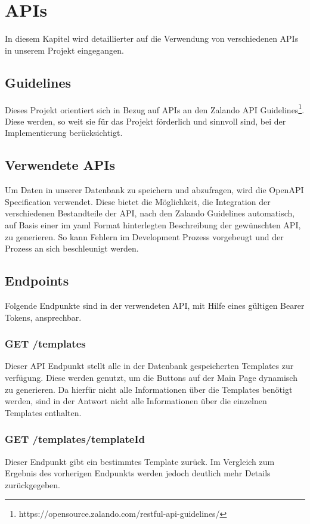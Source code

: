 \chapter{\ac{API}s}\label{ch:apis}
In diesem Kapitel wird detaillierter auf die Verwendung von verschiedenen \ac{API}s in unserem 
Projekt eingegangen.

\section{Guidelines}
Dieses Projekt orientiert sich in Bezug auf \ac{API}s an den Zalando API
Guidelines\footnote{https://opensource.zalando.com/restful-api-guidelines/}.
Diese werden, so weit sie für das Projekt förderlich und sinnvoll sind, bei der Implementierung
berücksichtigt.

\section{Verwendete \ac{API}s}
Um Daten in unserer Datenbank zu speichern und abzufragen, wird die OpenAPI Specification
verwendet. Diese bietet die Möglichkeit, die Integration der verschiedenen Bestandteile der
\ac{API}, nach den Zalando Guidelines automatisch, auf Basis einer im \Gls{yaml} Format hinterlegten
Beschreibung der gewünschten \ac{API}, zu generieren. So kann Fehlern im Development
Prozess vorgebeugt und der Prozess an sich beschleunigt werden.

\section{Endpoints}
Folgende Endpunkte sind in der verwendeten \ac{API}, mit Hilfe eines gültigen Bearer Tokens, ansprechbar. 

\subsection{GET /templates}

Dieser \ac{API} Endpunkt stellt alle in der Datenbank gespeicherten Templates zur verfügung.
Diese werden genutzt, um die Buttons auf der Main Page dynamisch zu generieren.
Da hierfür nicht alle Informationen über die Templates benötigt werden, sind in der Antwort nicht alle
Informationen über die einzelnen Templates enthalten.

\subsection{GET /templates/{templateId}}
Dieser Endpunkt gibt ein bestimmtes Template zurück. Im Vergleich zum Ergebnis des vorherigen
Endpunkts werden jedoch deutlich mehr Details zurückgegeben.

